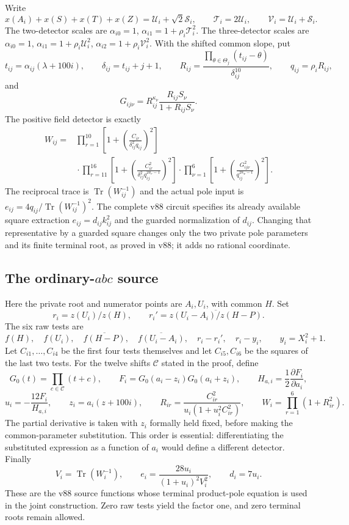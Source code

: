 \documentclass[11pt]{article}
\begin{document}
Write
\[
 x(A_i)+x(S)+x(T)+x(Z)=\mathcal U_i+\sqrt2\mathcal S_i,
 \qquad\mathcal T_i=2\mathcal U_i,\qquad
 \mathcal V_i=\mathcal U_i+\mathcal S_i.
\]
The two-detector scales are
$\alpha_{i0}=1$, $\alpha_{i1}=1+\rho_i\mathcal T_i^2$.
The three-detector scales are
$\alpha_{i0}=1$, $\alpha_{i1}=1+\rho_i\mathcal U_i^2$,
$\alpha_{i2}=1+\rho_i\mathcal V_i^2$.
With the shifted common slope, put
\[
 t_{ij}=\alpha_{ij}(\lambda+100i),\qquad
 \delta_{ij}=t_{ij}+j+1,\qquad
 R_{ij}=\frac{\prod_{\theta\in\Theta_j}(t_{ij}-\theta)}
                  {\delta_{ij}^{10}},\qquad q_{ij}=\rho_iR_{ij},
\]
and
\[
       G_{ij\nu}=R_{ij}^{\kappa_\nu}
                   \frac{R_{ij}S_\nu}{1+R_{ij}S_\nu}.
\]
The positive field detector is exactly
\[
 \begin{split}
 W_{ij}={}&\prod_{r=1}^{10}
       \left[1+\left(\frac{C_{ir}}{\delta_{ij}^2q_{ij}}\right)^2\right]\\
 &{}\cdot\prod_{r=11}^{16}
       \left[1+\left(\frac{C_{ir}^2}
                         {\delta_{ij}^2q_{ij}^{2a_r-1}}\right)^2\right]
 \cdot\prod_{\nu=1}^{6}
       \left[1+\left(\frac{G_{ij\nu}^2}
                              {q_{ij}^{2\kappa_\nu-1}}\right)^2\right].
 \end{split}
\]
The reciprocal trace is $\operatorname{Tr}(W_{ij}^{-1})$ and the
actual pole input is $e_{ij}=4q_{ij}/\operatorname{Tr}(W_{ij}^{-1})^2$.
The complete v88 circuit specifies its already available square
extraction $e_{ij}=d_{ij}k_{ij}^2$ and the guarded normalization of
$d_{ij}$.  Changing that representative by a guarded square changes
only the two private pole parameters and its finite terminal root,
as proved in v88; it adds no rational coordinate.

\subsection{The ordinary-$abc$ source}

Here the private root and numerator points are $A_i,U_i$, with
common $H$.  Set
\[
 r_i=z(U_i)/z(H),\qquad
 r_i'=\overline{z(U_i-A_i)/z(H-P)}.
\]
The six raw tests are
\[
 f(H),\quad f(U_i),\quad \overline{f(H-P)},\quad
 \overline{f(U_i-A_i)},\quad r_i-r_i',\quad r_i-y_i,
                 \qquad y_i=X_i^2+1.
\]
Let $C_{i1},\ldots,C_{i4}$ be the first four tests themselves and
let $C_{i5},C_{i6}$ be the squares of the last two tests.
For the twelve shifts $\mathcal C$ stated in the proof, define
\[
 G_0(t)=\prod_{c\in\mathcal C}(t+c),\qquad
 F_i=G_0(a_i-z_i)G_0(a_i+z_i),\qquad
 H_{a,i}=\frac12\frac{\partial F_i}{\partial a_i},
\]
\[
 u_i=-\frac{12F_i}{H_{a,i}},\qquad
 z_i=a_i(z+100i),\qquad
 R_{ir}=\frac{C_{ir}^2}{u_i(1+u_i^2C_{ir}^2)},\qquad
 W_i=\prod_{r=1}^6(1+R_{ir}^2).
\]
The partial derivative is taken with $z_i$ formally held fixed,
before making the common-parameter substitution.  This order is
essential: differentiating the substituted expression as a function
of $a_i$ would define a different detector.
Finally
\[
 V_i=\operatorname{Tr}(W_i^{-1}),\qquad
 e_i=\frac{28u_i}{(1+u_i)^2V_i^2},\qquad d_i=7u_i.
\]
These are the v88 source functions whose terminal product-pole
equation is used in the joint construction.  Zero raw tests yield
the factor one, and zero terminal roots remain allowed.
\end{document}
